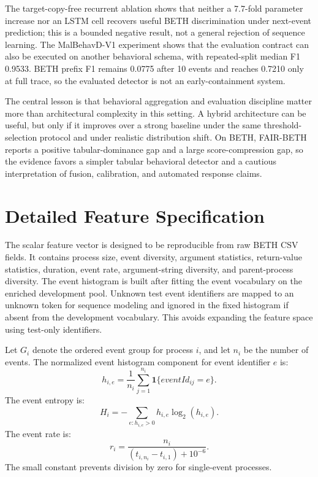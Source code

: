 \documentclass[10pt,journal,compsoc]{IEEEtran}
\begin{document}
The target-copy-free recurrent ablation shows that neither a 7.7-fold parameter increase nor an LSTM cell recovers useful BETH discrimination under next-event prediction; this is a bounded negative result, not a general rejection of sequence learning. The MalBehavD-V1 experiment shows that the evaluation contract can also be executed on another behavioral schema, with repeated-split median F1 0.9533. BETH prefix F1 remains 0.0775 after 10 events and reaches 0.7210 only at full trace, so the evaluated detector is not an early-containment system.

The central lesson is that behavioral aggregation and evaluation discipline matter more than architectural complexity in this setting. A hybrid architecture can be useful, but only if it improves over a strong baseline under the same threshold-selection protocol and under realistic distribution shift. On BETH, FAIR-BETH reports a positive tabular-dominance gap and a large score-compression gap, so the evidence favors a simpler tabular behavioral detector and a cautious interpretation of fusion, calibration, and automated response claims.

\appendices

\section{Detailed Feature Specification}
\label{app:features}

The scalar feature vector is designed to be reproducible from raw BETH CSV fields. It contains process size, event diversity, argument statistics, return-value statistics, duration, event rate, argument-string diversity, and parent-process diversity. The event histogram is built after fitting the event vocabulary on the enriched development pool. Unknown test event identifiers are mapped to an unknown token for sequence modeling and ignored in the fixed histogram if absent from the development vocabulary. This avoids expanding the feature space using test-only identifiers.

Let $G_i$ denote the ordered event group for process $i$, and let $n_i$ be the number of events. The normalized event histogram component for event identifier $e$ is:
\[
h_{i,e}=\frac{1}{n_i}\sum_{j=1}^{n_i}\mathbf{1}\{eventId_{ij}=e\}.
\]
The event entropy is:
\[
H_i=-\sum_{e:h_{i,e}>0}h_{i,e}\log_2(h_{i,e}).
\]
The event rate is:
\[
r_i=\frac{n_i}{(t_{i,n_i}-t_{i,1})+10^{-6}}.
\]
The small constant prevents division by zero for single-event processes.
\end{document}
